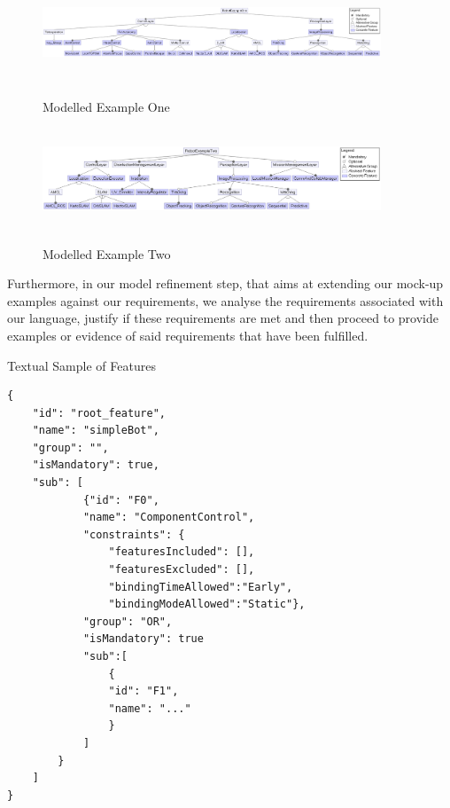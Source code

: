 \documentclass[conference]{IEEEtran}
\begin{document}
\begin{figure}[h]
\caption{Modelled Example One}
\centering
\includegraphics[width=0.9\textwidth,height=3cm]{diagrams/ex1.png}
\label{ex1}
\end{figure}

\begin{figure}[h]
\caption{Modelled Example Two}
\centering
\includegraphics[width=0.9\textwidth,height=3cm]{diagrams/ex2.png}
\label{ex2}
\end{figure}
    
Furthermore, in our model refinement step, that aims at extending our mock-up examples against our requirements, we analyse the requirements associated with our language, justify if these requirements are met and then proceed to provide examples or evidence of said requirements that have been fulfilled.

\begin{listing}[H]
\caption{Textual Sample of Features}
\begin{verbatim}
{
    "id": "root_feature",
    "name": "simpleBot",
    "group": "",
    "isMandatory": true,
    "sub": [
	        {"id": "F0",
	        "name": "ComponentControl",
	        "constraints": {
		        "featuresIncluded": [],
		        "featuresExcluded": [],
		        "bindingTimeAllowed":"Early",
		        "bindingModeAllowed":"Static"},
	        "group": "OR",
	        "isMandatory": true
	        "sub":[
	            {
	            "id": "F1",
	            "name": "..."
	            }
	        ]
        }
    ]
}
\end{verbatim}
\label{feat-conc-text}
\end{listing}
\end{document}
